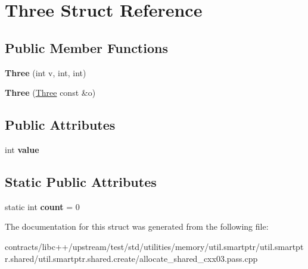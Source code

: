 \hypertarget{struct_three}{}\section{Three Struct Reference}
\label{struct_three}
\subsection*{Public Member Functions}
\begin{DoxyCompactItemize}
\item 
\mbox{\label{struct_three_a47159a5f381e8569b684e6c58251818f}} 
{\bfseries Three} (int v, int, int)
\item 
\mbox{\label{struct_three_a597abd87a21c88d253432a9f3779fc97}} 
{\bfseries Three} (\mbox{\hyperlink{struct_three}{Three}} const \&o)
\end{DoxyCompactItemize}
\subsection*{Public Attributes}
\begin{DoxyCompactItemize}
\item 
\mbox{\label{struct_three_a441383626042d61ab7cb73d1e8b52b45}} 
int {\bfseries value}
\end{DoxyCompactItemize}
\subsection*{Static Public Attributes}
\begin{DoxyCompactItemize}
\item 
\mbox{\label{struct_three_a1a7eeb8b43dde0a5a7009dc17fde46f5}} 
static int {\bfseries count} = 0
\end{DoxyCompactItemize}


The documentation for this struct was generated from the following file\+:\begin{DoxyCompactItemize}
\item 
contracts/libc++/upstream/test/std/utilities/memory/util.\+smartptr/util.\+smartptr.\+shared/util.\+smartptr.\+shared.\+create/allocate\+\_\+shared\+\_\+cxx03.\+pass.\+cpp\end{DoxyCompactItemize}
